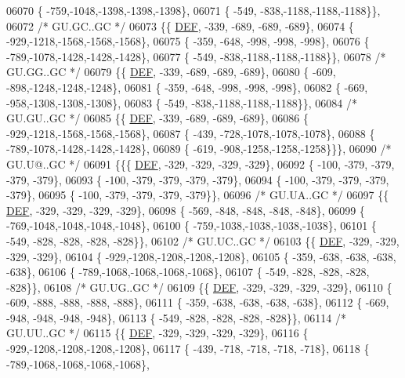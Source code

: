\begin{DoxyCode}
06070 \{ -759,-1048,-1398,-1398,-1398\},
06071 \{ -549, -838,-1188,-1188,-1188\}\},
06072 \textcolor{comment}{/* GU.GC..GC */}
06073 \{\{  \mbox{\hyperlink{1_88_84__epars_8h_a397419fc12b37ed479c8abb9d444d843}{DEF}}, -339, -689, -689, -689\},
06074 \{ -929,-1218,-1568,-1568,-1568\},
06075 \{ -359, -648, -998, -998, -998\},
06076 \{ -789,-1078,-1428,-1428,-1428\},
06077 \{ -549, -838,-1188,-1188,-1188\}\},
06078 \textcolor{comment}{/* GU.GG..GC */}
06079 \{\{  \mbox{\hyperlink{1_88_84__epars_8h_a397419fc12b37ed479c8abb9d444d843}{DEF}}, -339, -689, -689, -689\},
06080 \{ -609, -898,-1248,-1248,-1248\},
06081 \{ -359, -648, -998, -998, -998\},
06082 \{ -669, -958,-1308,-1308,-1308\},
06083 \{ -549, -838,-1188,-1188,-1188\}\},
06084 \textcolor{comment}{/* GU.GU..GC */}
06085 \{\{  \mbox{\hyperlink{1_88_84__epars_8h_a397419fc12b37ed479c8abb9d444d843}{DEF}}, -339, -689, -689, -689\},
06086 \{ -929,-1218,-1568,-1568,-1568\},
06087 \{ -439, -728,-1078,-1078,-1078\},
06088 \{ -789,-1078,-1428,-1428,-1428\},
06089 \{ -619, -908,-1258,-1258,-1258\}\}\},
06090 \textcolor{comment}{/* GU.U@..GC */}
06091 \{\{\{  \mbox{\hyperlink{1_88_84__epars_8h_a397419fc12b37ed479c8abb9d444d843}{DEF}}, -329, -329, -329, -329\},
06092 \{ -100, -379, -379, -379, -379\},
06093 \{ -100, -379, -379, -379, -379\},
06094 \{ -100, -379, -379, -379, -379\},
06095 \{ -100, -379, -379, -379, -379\}\},
06096 \textcolor{comment}{/* GU.UA..GC */}
06097 \{\{  \mbox{\hyperlink{1_88_84__epars_8h_a397419fc12b37ed479c8abb9d444d843}{DEF}}, -329, -329, -329, -329\},
06098 \{ -569, -848, -848, -848, -848\},
06099 \{ -769,-1048,-1048,-1048,-1048\},
06100 \{ -759,-1038,-1038,-1038,-1038\},
06101 \{ -549, -828, -828, -828, -828\}\},
06102 \textcolor{comment}{/* GU.UC..GC */}
06103 \{\{  \mbox{\hyperlink{1_88_84__epars_8h_a397419fc12b37ed479c8abb9d444d843}{DEF}}, -329, -329, -329, -329\},
06104 \{ -929,-1208,-1208,-1208,-1208\},
06105 \{ -359, -638, -638, -638, -638\},
06106 \{ -789,-1068,-1068,-1068,-1068\},
06107 \{ -549, -828, -828, -828, -828\}\},
06108 \textcolor{comment}{/* GU.UG..GC */}
06109 \{\{  \mbox{\hyperlink{1_88_84__epars_8h_a397419fc12b37ed479c8abb9d444d843}{DEF}}, -329, -329, -329, -329\},
06110 \{ -609, -888, -888, -888, -888\},
06111 \{ -359, -638, -638, -638, -638\},
06112 \{ -669, -948, -948, -948, -948\},
06113 \{ -549, -828, -828, -828, -828\}\},
06114 \textcolor{comment}{/* GU.UU..GC */}
06115 \{\{  \mbox{\hyperlink{1_88_84__epars_8h_a397419fc12b37ed479c8abb9d444d843}{DEF}}, -329, -329, -329, -329\},
06116 \{ -929,-1208,-1208,-1208,-1208\},
06117 \{ -439, -718, -718, -718, -718\},
06118 \{ -789,-1068,-1068,-1068,-1068\},

\end{DoxyCode}
